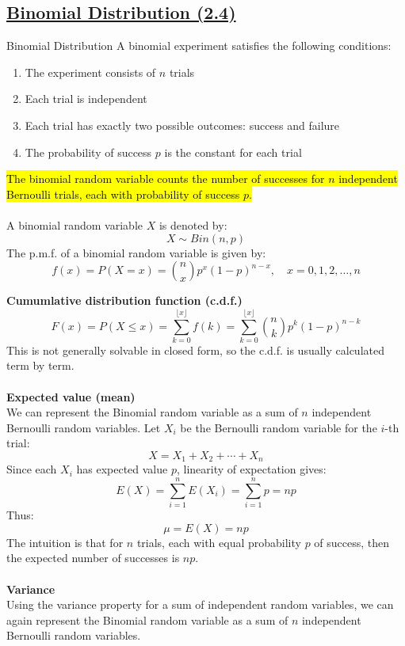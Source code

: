﻿\documentclass[12pt]{article}
\begin{document}
\subsection*{\underline{Binomial Distribution (2.4)}}
\begin{definition}{Binomial Distribution}
    A binomial experiment satisfies the following conditions:
    \begin{enumerate}
        \item The experiment consists of $n$ trials
        \item Each trial is independent
        \item Each trial has exactly two possible outcomes: success and failure
        \item The probability of success $p$ is the constant for each trial
    \end{enumerate}
    \hl{The binomial random variable counts the number of successes for $n$ independent Bernoulli trials, each with probability of success $p$. }\\\\
    A binomial random variable $X$ is denoted by:
    \[X \sim Bin(n,p)\]
    The p.m.f. of a binomial random variable is given by:
    \[\boxed{f(x) = P(X=x) = \binom{n}{x} p^x (1-p)^{n-x}, \quad x=0,1,2,\ldots,n}\]
\end{definition}
\textbf{Cumumlative distribution function (c.d.f.)}\\
\[
F(x)=P(X\leq x)=\sum_{k=0}^{\lfloor x \rfloor}f(k) = \sum_{k=0}^{\lfloor x \rfloor}\binom{n}{k} p^k (1-p)^{n-k}
\]
This is not generally solvable in closed form, so the c.d.f. is usually calculated term by term.\\\\
\textbf{Expected value (mean)}\\
We can represent the Binomial random variable as a sum of $n$ independent Bernoulli random variables. Let $X_i$ be the Bernoulli random variable for the $i$-th trial:
\[
X=X_1+X_2+\cdots+X_n
\]
Since each \(X_i\) has expected value \(p\), linearity of expectation gives:
\[
E(X)=\sum_{i=1}^{n}E(X_i)=\sum_{i=1}^{n}p=np
\]
Thus:
\[
\boxed{\mu=E(X)=np}
\]
The intuition is that for $n$ trials, each with equal probability $p$ of success, then the expected number of successes is $np$.\\\\
\textbf{Variance}\\
Using the variance property for a sum of independent random variables, we can again represent the Binomial random variable as a sum of $n$ independent Bernoulli random variables.\\\\
\end{document}
